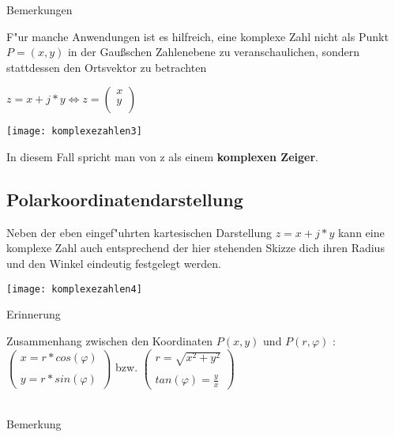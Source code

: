 \begin{Bemerkung}
Bemerkungen\\
\end{Bemerkung}

F"ur manche Anwendungen ist es hilfreich, eine komplexe Zahl nicht als Punkt $P=(x,y)$ in der Gaußschen Zahlenebene zu veranschaulichen, sondern stattdessen den Ortsvektor zu betrachten

$z=x+j*y \Leftrightarrow z=
\begin{pmatrix}
x\\
y\\
\end{pmatrix}$

\texttt{[image: komplexezahlen3]}

In diesem Fall spricht man von z als einem \textbf{komplexen Zeiger}.\\

	\subsection{Polarkoordinatendarstellung}

Neben der eben eingef"uhrten kartesischen Darstellung $z =x+j*y$ kann eine komplexe Zahl auch entsprechend der hier stehenden Skizze dich ihren Radius  und den Winkel  eindeutig festgelegt werden.

\texttt{[image: komplexezahlen4]}

\begin{Bemerkung}
Erinnerung\\
\end{Bemerkung}

Zusammenhang zwischen den Koordinaten $P(x,y)$ und $P(r,\varphi)$ :\\

$
\begin{pmatrix}
x=r*cos(\varphi)\\
\\
y=r*sin(\varphi)
\end{pmatrix}
$
bzw.
$
\begin{pmatrix}
r= \sqrt{x^2+y^2}\\
\\
tan(\varphi) = \frac{y}{x}
\end{pmatrix}
$
\\
\\

\begin{Bemerkung}
Bemerkung\\
\end{Bemerkung}

